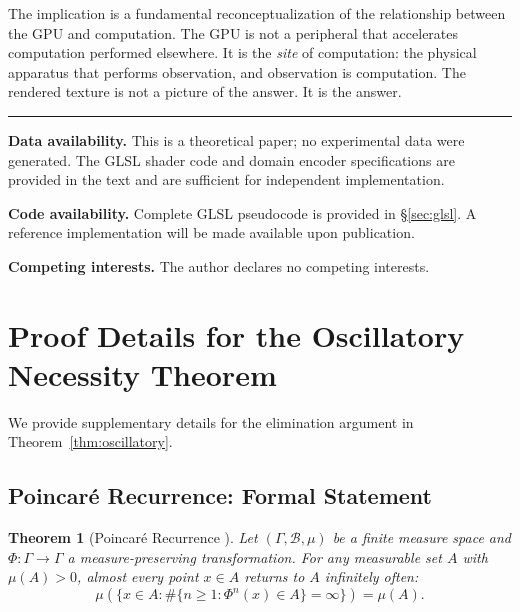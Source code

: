 \documentclass[11pt,twocolumn,a4paper]{article}
\newtheorem{theorem}{Theorem}[section]
\begin{document}
The implication is a fundamental reconceptualization of the
relationship between the GPU and computation. The GPU is not a
peripheral that accelerates computation performed elsewhere. It is the
\emph{site} of computation: the physical apparatus that performs
observation, and observation is computation. The rendered texture is
not a picture of the answer. It is the answer.

\vspace{12pt}
\noindent\rule{\columnwidth}{0.4pt}
\vspace{4pt}

{\small
\noindent\textbf{Data availability.}
This is a theoretical paper; no experimental data were generated.
The GLSL shader code and domain encoder specifications are provided
in the text and are sufficient for independent implementation.

\noindent\textbf{Code availability.}
Complete GLSL pseudocode is provided in \S\ref{sec:glsl}. A reference
implementation will be made available upon publication.

\noindent\textbf{Competing interests.}
The author declares no competing interests.
}








\appendix

\section{Proof Details for the Oscillatory Necessity Theorem}
\label{app:oscillatory}

We provide supplementary details for the elimination argument in
Theorem~\ref{thm:oscillatory}.

\subsection{Poincar\'{e} Recurrence: Formal Statement}

\begin{theorem}[Poincar\'{e} Recurrence \citep{poincare1890}]
Let $(\Gamma, \mathcal{B}, \mu)$ be a finite measure space and
$\Phi : \Gamma \to \Gamma$ a measure-preserving transformation.
For any measurable set $A$ with $\mu(A) > 0$, almost every point
$x \in A$ returns to $A$ infinitely often:
\begin{equation}
\mu\!\left(\{x \in A :
  \#\{n \geq 1 : \Phi^n(x) \in A\} = \infty\}\right)
= \mu(A).
\end{equation}
\end{theorem}
\end{document}
